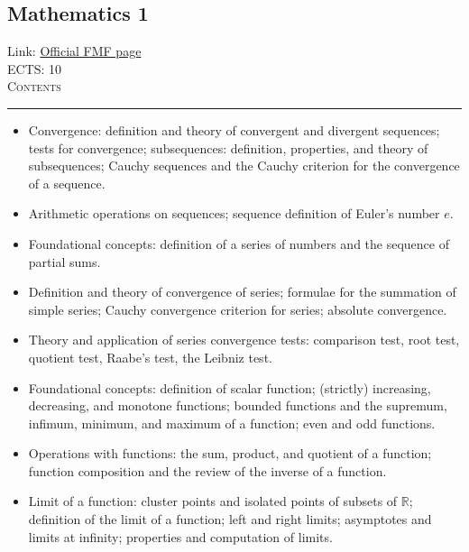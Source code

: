 \documentclass[11pt, a4paper]{article}
\newenvironment{course}[3]{
\subsection{#1}%
Link: \href{#2}{Official FMF page}\\%
ECTS: #3%
\vspace{1ex}
\\
{\large \textsc{Contents}}\\[-0.9ex]%
\rule{\textwidth}{0.5pt}
\vspace{-3ex}
}
{}
\newenvironment{chapter}[1]{
\begin{tcolorbox}[title=#1, breakable]
}
{\end{tcolorbox}}
\begin{document}
\begin{course}{Mathematics 1}{https://www.fmf.uni-lj.si/en/study-physics/programmes/1fiz/2020/7000777/courses/520/}{10}
\begin{chapter}{Number sequences}
\begin{itemize}
            \item Convergence: definition and theory of convergent and divergent sequences; tests for convergence;
            subsequences: definition, properties, and theory of subsequences;
            Cauchy sequences and the Cauchy criterion for the convergence of a sequence.

            \item Arithmetic operations on sequences; sequence definition of Euler's number $ e $.
        
        \end{itemize}
    \end{chapter}

    \begin{chapter}{Series of numbers}
        \begin{itemize}
        
            \item Foundational concepts: definition of a series of numbers and the sequence of partial sums.

            \item Definition and theory of convergence of series; formulae for the summation of simple series; Cauchy convergence criterion for series; absolute convergence.

            \item Theory and application of series convergence tests: comparison test, root test, quotient test, Raabe's test, the Leibniz test.
        
        \end{itemize}
    \end{chapter}

    \begin{chapter}{Functions of a single variable}
        \begin{itemize}
        
            \item Foundational concepts: definition of scalar function; (strictly) increasing, decreasing, and monotone functions; bounded functions and the supremum, infimum, minimum, and maximum of a function; even and odd functions.

            \item Operations with functions: the sum, product, and quotient of a function; function composition and the review of the inverse of a function.

            \item Limit of a function: cluster points and isolated points of subsets of $ \mathbb{R} $; definition of the limit of a function; left and right limits; asymptotes and limits at infinity; properties and computation of limits.


\end{itemize}
\end{chapter}
\end{course}
\end{document}
